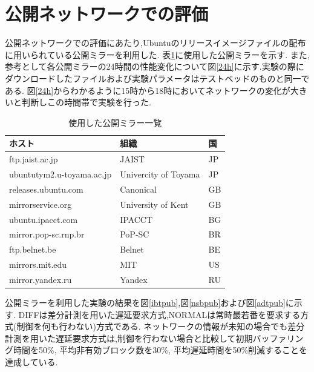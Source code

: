 \documentclass[a4j,12pt]{gradthesis_utf8}
\begin{document}
\clearpage

\section{公開ネットワークでの評価}
\label{pub}
公開ネットワークでの評価にあたり,Ubuntuのリリースイメージファイルの配布に用いられている公開ミラーを利用した.
表\ref{tablemirror}に使用した公開ミラーを示す.
また,参考として各公開ミラーの24時間の性能変化について図\ref{24h}に示す.実験の際にダウンロードしたファイルおよび実験パラメータはテストベッドのものと同一である.
図\ref{24h}からわかるように15時から18時においてネットワークの変化が大きいと判断しこの時間帯で実験を行った.
\begin{table}[htb]
	\begin{center}
		\caption{使用した公開ミラー一覧}
		\label{tablemirror}
		\begin{tabular}{|l|l|l|} \hline
			ホスト & 組織 & 国\\ \hline \hline
			ftp.jaist.ac.jp & JAIST & JP \\
			ubuntutym2.u-toyama.ac.jp & Univercity of Toyama & JP \\
			releases.ubuntu.com & Canonical & GB \\
			mirrorservice.org & University of Kent & GB \\
			ubuntu.ipacct.com & IPACCT & BG \\
			mirror.pop-sc.rnp.br & PoP-SC & BR \\
			ftp.belnet.be & Belnet & BE \\
			mirrors.mit.edu & MIT & US \\
			mirror.yandex.ru & Yandex & RU \\ \hline
		\end{tabular}
	\end{center}
\end{table}

公開ミラーを利用した実験の結果を図\ref{ibtpub},図\ref{nsbpub}および図\ref{adtpub}に示す.
DIFFは差分計測を用いた遅延要求方式,NORMALは常時最若番を要求する方式(制御を何も行わない)方式である.
ネットワークの情報が未知の場合でも差分計測を用いた遅延要求方式は,制御を行わない場合と比較して初期バッファリング時間を50\%, 平均非有効ブロック数を30\%, 平均遅延時間を50\%削減することを達成している.
\end{document}
